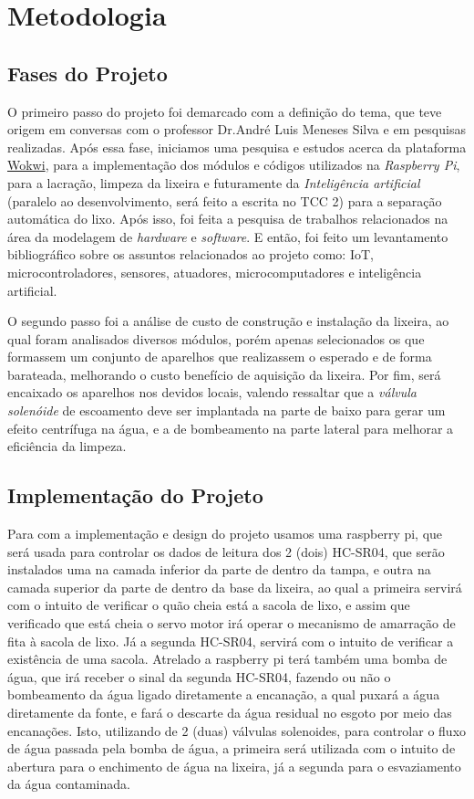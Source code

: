 \section{Metodologia}

\subsection{Fases do Projeto}
O primeiro passo do projeto foi demarcado com a definição do tema, que teve origem em conversas com o professor Dr.André Luis Meneses Silva e em pesquisas realizadas. Após essa fase, iniciamos uma pesquisa e estudos acerca da plataforma \href{https://wokwi.com/}{Wokwi}, para a implementação dos módulos e códigos utilizados na \textit{Raspberry Pi}, para a lacração, limpeza da lixeira e futuramente da \textit{Inteligência artificial} (paralelo ao desenvolvimento, será feito a escrita no TCC 2) para a separação automática do lixo. Após isso, foi feita a pesquisa de trabalhos relacionados na área da modelagem de \textit{hardware} e \textit{software}. E então, foi feito um levantamento bibliográfico sobre os assuntos relacionados ao projeto como: IoT, microcontroladores, sensores, atuadores,  microcomputadores e inteligência artificial.

O segundo passo foi a análise de custo de construção e instalação da lixeira, ao qual foram analisados diversos módulos, porém apenas selecionados os que formassem um conjunto de aparelhos que realizassem o esperado e de forma barateada, melhorando o custo benefício de aquisição da lixeira. Por fim, será encaixado os aparelhos nos devidos locais, valendo ressaltar que a \textit{válvula solenóide} de escoamento deve ser implantada na parte de baixo para gerar um efeito centrífuga na água, e a de bombeamento na parte lateral para melhorar a eficiência da limpeza.

\subsection{Implementação do Projeto}
Para com a implementação e design do projeto usamos uma raspberry pi, que será usada para controlar os dados de leitura dos 2 (dois) HC-SR04, que serão instalados uma na camada inferior da parte de dentro da tampa, e outra na camada superior da parte de dentro da base da lixeira, ao qual a primeira servirá com o intuito de verificar o quão cheia está a sacola de lixo, e assim que verificado que está cheia o servo motor irá operar o mecanismo de amarração de fita à sacola de lixo. Já a segunda HC-SR04, servirá com o intuito de verificar a existência de uma sacola. Atrelado a raspberry pi terá também uma bomba de água, que irá receber o sinal da segunda HC-SR04, fazendo ou não o bombeamento da água ligado diretamente a encanação, a qual puxará a água diretamente da fonte, e fará o descarte da água residual no esgoto por meio das encanações. Isto, utilizando de 2 (duas) válvulas solenoides, para controlar o fluxo de água passada pela bomba de água, a primeira será utilizada com o intuito de abertura para o enchimento de água na lixeira, já a segunda para o esvaziamento da água contaminada.

